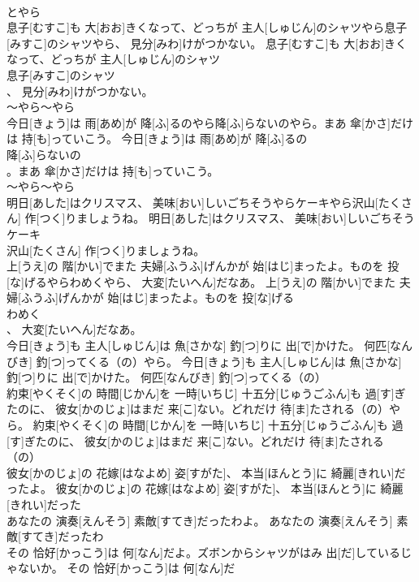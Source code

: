 \documentclass[8pt]{extreport}
\begin{document}
\begin{CJK}{UTF8}{min}
\\	とやら
\\	息子[むすこ]も 大[おお]きくなって、どっちが 主人[しゅじん]のシャツやら息子[みすこ]のシャツやら、 見分[みわ]けがつかない。	息子[むすこ]も 大[おお]きくなって、どっちが 主人[しゅじん]のシャツ
\\	息子[みすこ]のシャツ
\\	、 見分[みわ]けがつかない。	
\\	～やら～やら 
\\	今日[きょう]は 雨[あめ]が 降[ふ]るのやら降[ふ]らないのやら。まあ 傘[かさ]だけは 持[も]っていこう。	今日[きょう]は 雨[あめ]が 降[ふ]るの
\\	降[ふ]らないの
\\	。まあ 傘[かさ]だけは 持[も]っていこう。	
\\	～やら～やら 
\\	明日[あした]はクリスマス、 美味[おい]しいごちそうやらケーキやら沢山[たくさん] 作[つく]りましょうね。	明日[あした]はクリスマス、 美味[おい]しいごちそう
\\	ケーキ
\\	沢山[たくさん] 作[つく]りましょうね。	
\\	上[うえ]の 階[かい]でまた 夫婦[ふうふ]げんかが 始[はじ]まったよ。ものを 投[な]げるやらわめくやら、 大変[たいへん]だなあ。	上[うえ]の 階[かい]でまた 夫婦[ふうふ]げんかが 始[はじ]まったよ。ものを 投[な]げる
\\	わめく
\\	、 大変[たいへん]だなあ。	
\\	今日[きょう]も 主人[しゅじん]は 魚[さかな] 釣[つ]りに 出[で]かけた。 何匹[なんびき] 釣[つ]ってくる（の）やら。	今日[きょう]も 主人[しゅじん]は 魚[さかな] 釣[つ]りに 出[で]かけた。 何匹[なんびき] 釣[つ]ってくる（の）
\\	約束[やくそく]の 時間[じかん]を 一時[いちじ] 十五分[じゅうごふん]も 過[す]ぎたのに、 彼女[かのじょ]はまだ 来[こ]ない。どれだけ 待[ま]たされる（の）やら。	約束[やくそく]の 時間[じかん]を 一時[いちじ] 十五分[じゅうごふん]も 過[す]ぎたのに、 彼女[かのじょ]はまだ 来[こ]ない。どれだけ 待[ま]たされる（の）
\\	彼女[かのじょ]の 花嫁[はなよめ] 姿[すがた]、 本当[ほんとう]に 綺麗[きれい]だったよ。	彼女[かのじょ]の 花嫁[はなよめ] 姿[すがた]、 本当[ほんとう]に 綺麗[きれい]だった
\\	あなたの 演奏[えんそう] 素敵[すてき]だったわよ。	あなたの 演奏[えんそう] 素敵[すてき]だったわ
\\	その 恰好[かっこう]は 何[なん]だよ。ズボンからシャツがはみ 出[だ]しているじゃないか。	その 恰好[かっこう]は 何[なん]だ

\end{CJK}
\end{document}
